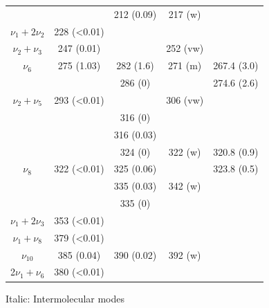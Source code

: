 \documentclass[12pt,a4paper,openany]{book}
\begin{document}
\begin{table}[h]
\begin{center}
\begin{threeparttable}
\begin{tabular}{c c c c c}
	 				&  & 212 (0.09) & 217 (w) & \\
	 				$\nu_{1}+ 2\nu_{2}$ & 228 (<0.01) & & & \\
	 				$\nu_{2}+\nu_{3}$& 247 (0.01) &  & 252 (vw) & \\
	 				$\nu_{6}$ & 275 (1.03) & 282 (1.6) & 271 (m) & 267.4 (3.0)\\
	 				&  & 286 (0) &  & 274.6 (2.6)\\
	 				$\nu_{2}+ \nu_{5}$ & 293 (<0.01) &  & 306 (vw) & \\
	 				& & 316 (0) & & \\
	 				& & 316 (0.03) & & \\
	 				&  & 324 (0) & 322 (w) & 320.8 (0.9)\\
	 				$\nu_{8}$& 322 (<0.01) & 325 (0.06) & & 323.8 (0.5)\\
	 				&  & 335 (0.03) & 342 (w) & \\
	 				& & 335 (0) & & \\
	 				$\nu_{1}+ 2\nu_{3}$ & 353 (<0.01) & &  & \\	
	 				$\nu_{1}+ \nu_{8}$ & 379 (<0.01) & & & \\
	 				$\nu_{10}$ & 385 (0.04) & 390 (0.02) &  392 (w) & \\
	 				2$\nu_{1}+ \nu_{6}$ & 380 (<0.01) &  & & \\
	 				\bottomrule	    
	 			\end{tabular}
	 			
	 			\begin{tablenotes}
	 				\item[] Italic: Intermolecular modes
	 			\end{tablenotes}
	 		\end{threeparttable}
	 	\end{center}
	 \end{table}
	 
	 
	
	
	
\end{document}
